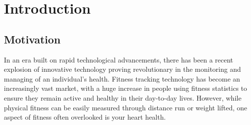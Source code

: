 \documentclass{l4proj}
\begin{document}
%
%
%
%
%
%
%
%
\chapter{Introduction}
\label{sec:introduction}


\section{Motivation}
\label{sec:motivation}

In an era built on rapid technological advancements, there has been a recent explosion of innovative technology proving revolutionary in the monitoring and managing of an individual’s health. Fitness tracking technology has become an increasingly vast market, with a huge increase in people using fitness statistics to ensure they remain active and healthy in their day-to-day lives. However, while physical fitness can be easily measured through distance run or weight lifted, one aspect of fitness often overlooked is your heart health. 
\end{document}
